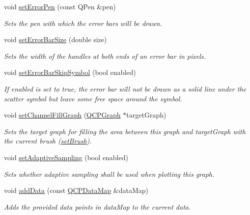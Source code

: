 \begin{DoxyCompactItemize}
void \hyperlink{classQCPGraph_abd4c7f81939e10776ea64603a704f22a}{set\+Error\+Pen} (const Q\+Pen \&pen)
\begin{DoxyCompactList}\small\item\em Sets the pen with which the error bars will be drawn. \end{DoxyCompactList}\item 
\hypertarget{classQCPGraph_a10f50c5495ce45ef559ec2066194a335}{}void \hyperlink{classQCPGraph_a10f50c5495ce45ef559ec2066194a335}{set\+Error\+Bar\+Size} (double size)\label{classQCPGraph_a10f50c5495ce45ef559ec2066194a335}

\begin{DoxyCompactList}\small\item\em Sets the width of the handles at both ends of an error bar in pixels. \end{DoxyCompactList}\item 
void \hyperlink{classQCPGraph_ab1c1ee03d8dd94676a564e5e5f11aac2}{set\+Error\+Bar\+Skip\+Symbol} (bool enabled)
\begin{DoxyCompactList}\small\item\em If {\itshape enabled} is set to true, the error bar will not be drawn as a solid line under the scatter symbol but leave some free space around the symbol. \end{DoxyCompactList}\item 
void \hyperlink{classQCPGraph_a2d03156df1b64037a2e36cfa50351ca3}{set\+Channel\+Fill\+Graph} (\hyperlink{classQCPGraph}{Q\+C\+P\+Graph} $\ast$target\+Graph)
\begin{DoxyCompactList}\small\item\em Sets the target graph for filling the area between this graph and {\itshape target\+Graph} with the current brush (\hyperlink{classQCPAbstractPlottable_a7a4b92144dca6453a1f0f210e27edc74}{set\+Brush}). \end{DoxyCompactList}\item 
void \hyperlink{classQCPGraph_ab468cd600160f327836aa0644291e64c}{set\+Adaptive\+Sampling} (bool enabled)
\begin{DoxyCompactList}\small\item\em Sets whether adaptive sampling shall be used when plotting this graph. \end{DoxyCompactList}\item 
void \hyperlink{classQCPGraph_aa5c6181d84db72ce4dbe9dc15a34ef4f}{add\+Data} (const \hyperlink{qcustomplot_8h_a84a9c4a4c2216ccfdcb5f3067cda76e3}{Q\+C\+P\+Data\+Map} \&data\+Map)
\begin{DoxyCompactList}\small\item\em Adds the provided data points in {\itshape data\+Map} to the current data. \end{DoxyCompactList}\item 

\end{DoxyCompactItemize}
